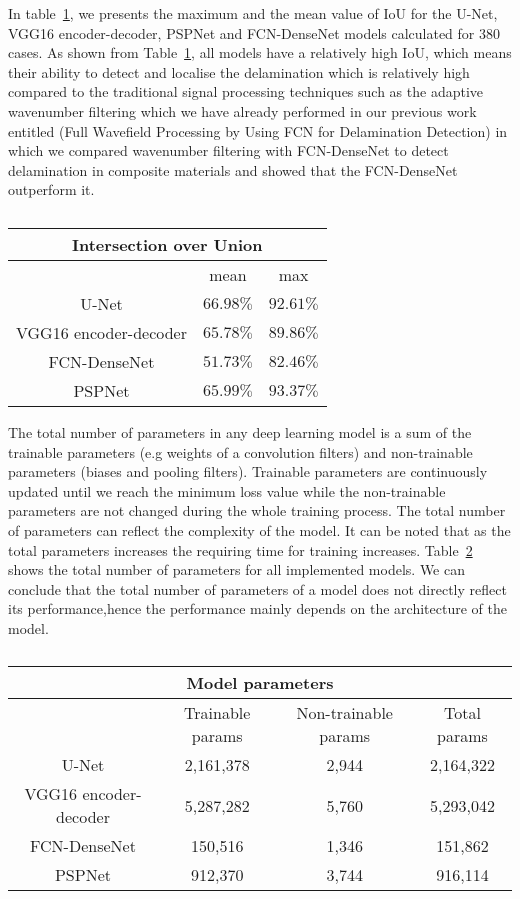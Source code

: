 In table~\ref{tab:table_iou}, we presents the maximum and the mean value of IoU for the U-Net, VGG16 encoder-decoder, PSPNet and FCN-DenseNet models calculated for 380 cases.
As shown from Table~\ref{tab:table_iou}, all models have a relatively high IoU, which means their ability to detect and localise the delamination which is relatively high compared to the traditional signal processing techniques such as the adaptive wavenumber filtering which we have already performed in our previous work entitled (Full Wavefield Processing by Using FCN for Delamination Detection) in which we compared wavenumber filtering with FCN-DenseNet to detect delamination in composite materials and showed that the FCN-DenseNet outperform it.
\begin{table}[]
	\centering
	\caption{}
	\label{tab:table_iou}
	\begin{tabular}{ccc}
		\multicolumn{3}{c}{Intersection over Union} \\ \hline
		& mean & max \\ \hline
		U-Net & \(66.98\%\) & \(92.61\%\) \\ \hline
		VGG16 encoder-decoder & \(65.78\%\) & \(89.86\%\) \\ \hline
		FCN-DenseNet & \(51.73\%\) & \(82.46\%\) \\ \hline
		PSPNet & \(65.99\%\) & \(93.37\%\) \\ \hline
	\end{tabular}
\end{table}
The total number of parameters in any deep learning model is a sum of the trainable parameters (e.g weights of a convolution filters) and non-trainable parameters (biases and  pooling filters).
Trainable parameters are continuously updated until we reach the minimum loss value while the non-trainable parameters are not changed during the whole training process.
The total number of parameters can reflect the complexity of the model.
It can be noted that as the total parameters increases the requiring time for training increases.
Table~\ref{tab:table_parameters} shows the total number of parameters for all implemented models.
We can conclude that the total number of parameters of a model does not directly reflect its performance,hence the performance mainly depends on the architecture of the model. 
\begin{table}[]
	\centering
	\caption{}
	\label{tab:table_parameters}
	\resizebox{\textwidth}{!}
	{
		\begin{tabular}{cccc}
			\multicolumn{4}{c}{Model parameters} \\ \hline
			& Trainable params & Non-trainable params & Total params \\ \hline
			U-Net & 2,161,378 & 2,944 & 2,164,322 \\ \hline
			VGG16 encoder-decoder & 5,287,282 & 5,760 & 5,293,042 \\ \hline
			FCN-DenseNet & 150,516 & 1,346 & 151,862 \\ \hline
			PSPNet & 912,370 & 3,744 & 916,114 \\ \hline
		\end{tabular}
	}
\end{table}
\label{section:results_and_discussions}
